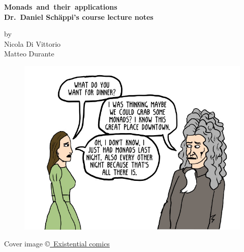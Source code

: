 \documentclass[a4paper,11pt,fullpage,oneside,openany]{amsbook}
\theoremstyle{definition}
\theoremstyle{definition}
\theoremstyle{remark}
\begin{document}
	\begin{titlepage}
		\begin{center}
			\Huge \bf{Monads~and~their~applications}\\
			\vspace{1cm}
			\Large Dr.\ Daniel Schäppi's course lecture notes\\
		\end{center}
		
		\vspace{1cm}

			\begin{center}
			\Large	by\\
				\vspace{.2cm}
			\Large	Nicola Di Vittorio\\
			\Large	Matteo Durante 
		
\vspace{1.5cm}
\begin{figure}[!b]
	\centering
	\includegraphics[scale=.7]{monadsForDinner.jpg}\\
\end{figure}	
\end{center}
		
	\end{titlepage}


\frontmatter
	\thispagestyle{empty}\doclicenseThis
	Cover image \copyright \href{http://existentialcomics.com/comic/other/10}{\ Existential comics}
	\tableofcontents
	
	\mainmatter
	
\end{document}
